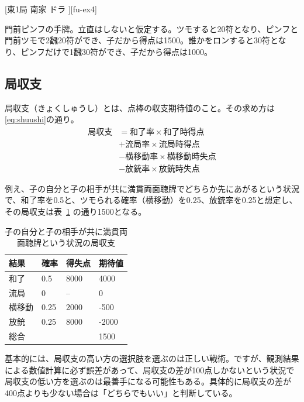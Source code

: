 \documentclass[10pt, twocolumn]{article}
\begin{document}
[東1局 南家 ドラ ][fu-ex4]

門前ピンフの手牌。立直はしないと仮定する。ツモすると20符となり、ピンフと門前ツモで2飜20符ができ、子だから得点は1500。誰かをロンすると30符となり、ピンフだけで1飜30符ができ、子だから得点は1000。


\subsection{局収支}

局収支（きょくしゅうし）とは、点棒の収支期待値のこと\citep[][p. 17]{miinin-stat}。その求め方は\eqref{eq:shuushi}の通り\citep[][p. 18]{miinin-stat}。
%
\begin{align}
  \text{局収支} &= \text{和了率} \times \text{和了時得点} \nonumber \\
  &+ \text{流局率} \times \text{流局時得点} \nonumber \\
  &- \text{横移動率} \times \text{横移動時失点} \nonumber \\
  &- \text{放銃率} \times \text{放銃時失点} \label{eq:shuushi}
\end{align}

例え、子の自分と子の相手が共に満貫両面聴牌でどちらか先にあがるという状況で、和了率を0.5と、ツモられる確率（横移動）を0.25、放銃率を0.25と想定し、その局収支は表~\ref{tab:kss1} の通り1500となる。

\begin{table}
  \centering
  \begin{tabular}{llll}
    結果 & 確率 & 得失点 & 期待値 \\
    \hline
    和了  & 0.5 & 8000  & 4000 \\
    流局  & 0 & --      & 0 \\
    横移動 & 0.25 & 2000 & -500 \\
    放銃  & 0.25 & 8000 & -2000 \\
    総合 & & & 1500
  \end{tabular}
  \caption{子の自分と子の相手が共に満貫両面聴牌という状況の局収支}
  \label{tab:kss1}
\end{table}

基本的には、局収支の高い方の選択肢を選ぶのは正しい戦術。ですが、観測結果による数値計算に必ず誤差があって、局収支の差が100点しかないという状況で局収支の低い方を選ぶのは最善手になる可能性もある\citep[][p. 21]{miinin-stat}。具体的に局収支の差が400点よりも少ない場合は「どちらでもいい」と判断している\citep[][p.25]{miinin-stat}。


\nocite{*}


\end{document}
